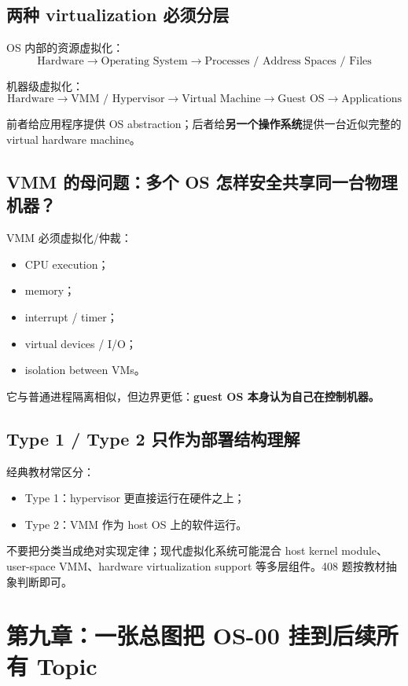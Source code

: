 \documentclass[11pt,a4paper]{ctexart}
\newcommand{\kw}[1]{\textbf{#1}}
\begin{document}
\subsection{两种 virtualization 必须分层}

OS 内部的资源虚拟化：
\[
\boxed{
\text{Hardware}
\rightarrow
\text{Operating System}
\rightarrow
\text{Processes / Address Spaces / Files}
}
\]

机器级虚拟化：
\[
\boxed{
\text{Hardware}
\rightarrow
\text{VMM / Hypervisor}
\rightarrow
\text{Virtual Machine}
\rightarrow
\text{Guest OS}
\rightarrow
\text{Applications}
}
\]

前者给应用程序提供 OS abstraction；后者给\kw{另一个操作系统}提供一台近似完整的 virtual hardware machine。

\subsection{VMM 的母问题：多个 OS 怎样安全共享同一台物理机器？}

VMM 必须虚拟化/仲裁：
\begin{itemize}
  \item CPU execution；
  \item memory；
  \item interrupt / timer；
  \item virtual devices / I/O；
  \item isolation between VMs。
\end{itemize}

它与普通进程隔离相似，但边界更低：\kw{guest OS 本身认为自己在控制机器。}

\subsection{Type 1 / Type 2 只作为部署结构理解}

经典教材常区分：
\begin{itemize}
  \item Type 1：hypervisor 更直接运行在硬件之上；
  \item Type 2：VMM 作为 host OS 上的软件运行。
\end{itemize}

不要把分类当成绝对实现定律；现代虚拟化系统可能混合 host kernel module、user-space VMM、hardware virtualization support 等多层组件。408 题按教材抽象判断即可。

\section{第九章：一张总图把 OS-00 挂到后续所有 Topic}
\end{document}

